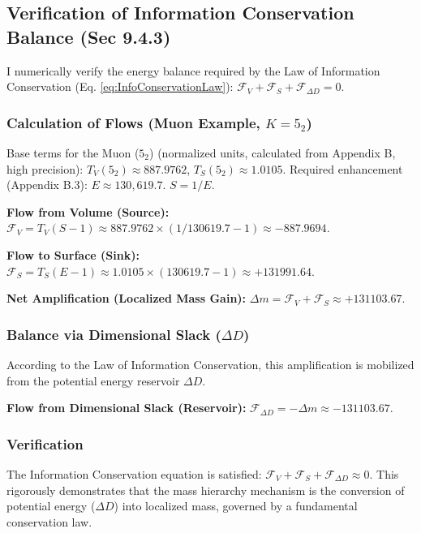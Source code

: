 \documentclass[11pt, a4paper]{article}
\theoremstyle{definition}
\theoremstyle{definition}
\newcommand{\Fv}{\mathcal{F}_V} %
\newcommand{\Fs}{\mathcal{F}_S} %
\newcommand{\FdD}{\mathcal{F}_{\Delta D}} %
\begin{document}
\subsection{Verification of Information Conservation Balance (Sec 9.4.3)}
\label{app:InfoConservationVerification}
I numerically verify the energy balance required by the Law of Information Conservation (Eq. \eqref{eq:InfoConservationLaw}): $\Fv + \Fs + \FdD = 0$.

\subsubsection{Calculation of Flows (Muon Example, $K=5_2$)}
Base terms for the Muon ($5_2$) (normalized units, calculated from Appendix B, high precision):
$T_V(5_2) \approx 887.9762$, $T_S(5_2) \approx 1.0105$.
Required enhancement (Appendix B.3): $E \approx 130,619.7$. $S = 1/E$.

\textbf{Flow from Volume (Source):}
$\Fv = T_V(S-1) \approx 887.9762 \times (1/130619.7 - 1) \approx -887.9694$.

\textbf{Flow to Surface (Sink):}
$\Fs = T_S(E-1) \approx 1.0105 \times (130619.7 - 1) \approx +131991.64$.

\textbf{Net Amplification (Localized Mass Gain):}
$\Delta m = \Fv + \Fs \approx +131103.67$.

\subsubsection{Balance via Dimensional Slack ($\Delta D$)}
According to the Law of Information Conservation, this amplification is mobilized from the potential energy reservoir $\Delta D$.

\textbf{Flow from Dimensional Slack (Reservoir):}
$\FdD = - \Delta m \approx -131103.67$.

\subsubsection{Verification}
The Information Conservation equation is satisfied: $\Fv + \Fs + \FdD \approx 0$.
This rigorously demonstrates that the mass hierarchy mechanism is the conversion of potential energy ($\Delta D$) into localized mass, governed by a fundamental conservation law.

\end{document}
